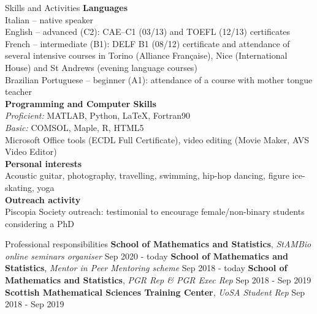 \documentclass{resume} %
\begin{document}
\begin{rSection}{Skills and Activities}
{\bf Languages} \\
{Italian -- native speaker \\
English -- advanced (C2): CAE–C1 (03/13) and TOEFL (12/13) certificates \\
French – intermediate (B1): DELF B1 (08/12) certificate and attendance of several intensive courses in Torino (Alliance Française), Nice (International House) and St Andrews (evening language courses) \\ Brazilian Portuguese – beginner (A1): attendance of a course with mother tongue teacher} \\
{\bf Programming and Computer Skills} \\
{{\em Proficient:} MATLAB, Python, LaTeX, Fortran90 \\ {\em Basic:} COMSOL, Maple, R, HTML5 \\  Microsoft Office tools (ECDL Full Certificate), video editing (Movie Maker, AVS Video Editor)} \\
{\bf Personal interests} \\
{Acoustic guitar, photography, travelling, swimming, hip-hop dancing, figure ice-skating, yoga} \\
{\bf Outreach activity} \\
{Piscopia Society outreach: %
 testimonial to encourage female/non-binary students considering a PhD } 
\end{rSection}

\begin{rSection}{Professional responsibilities}
{\bf School of Mathematics and Statistics}, {\em StAMBio online seminars organiser} \hfill {Sep 2020 - today} 
{\bf School of Mathematics and Statistics}, {\em Mentor in Peer Mentoring scheme} \hfill {Sep 2018 - today} 
{\bf School of Mathematics and Statistics}, {\em PGR Rep \& PGR Exec Rep} \hfill {Sep 2018 - Sep 2019} \\
{\bf Scottish Mathematical Sciences Training Center}, {\em UoSA Student Rep} \hfill {Sep 2018 - Sep 2019} 
\end{rSection}
\end{document}
